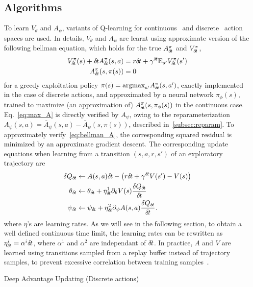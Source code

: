 \subsection{Algorithms}
\label{subsec:algorithm}
To learn $V_{\theta}$ and $A_{\psi}$, variants of Q-learning for continuous~\cite{ddpg} and
discrete~\cite{dqn} action spaces are used. In details, $V_{\theta}$ and $A_{\psi}$ are learnt
using approximate version of the following bellman equation, which holds for the true $A^\pi_{\delta\hspace{-.1em}t}$
and $V^\pi_{\delta\hspace{-.1em}t}$,
\begin{align}
	V^{\pi}_{\delta\hspace{-.1em}t}(s) + {\delta\hspace{-.1em}t} A^{\pi}_{\delta\hspace{-.1em}t}(s, a) &= r{\delta\hspace{-.1em}t} + \gamma^{{\delta\hspace{-.1em}t}}  \mathbb{E}_{s'} V^{\pi}_{\delta\hspace{-.1em}t}(s')\label{eq:bellman_A}\\
	A^{\pi}_{\delta\hspace{-.1em}t}(s, \pi(s)) &= 0\label{eq:max_A}
\end{align}
for a greedy exploitation policy $\pi(s) = \text{argmax}_{a'}A^\pi_{\delta\hspace{-.1em}t}(s,
a')$, exactly implemented in the case of discrete actions, and approximated by
a neural network $\pi_\phi(s)$, trained to maximize (an approximation of)
$A^\pi_{\delta\hspace{-.1em}t}(s, \pi_\phi(s))$ in the continuous case.  Eq.~\eqref{eq:max_A}
is directly verified by $A_{\psi}$, owing to the reparameterization
$A_\psi(s, a) = \bar{A}_\psi(s, a) - \bar{A}_\psi(s, \pi(s))$, described
in~\ref{subsec:reparam}.  To approximately verify~\eqref{eq:bellman_A}, the
corresponding squared residual is minimized by an approximate gradient descent.
The corresponding update equations when learning from a transition $(s, a, r, s')$ of
an exploratory trajectory are
\begin{align}
	\delta Q_{\delta\hspace{-.1em}t} &\leftarrow A(s, a) {\delta\hspace{-.1em}t} - \left(r {\delta\hspace{-.1em}t} + \gamma^{{\delta\hspace{-.1em}t}} V(s') - V(s)\right)\\
	\theta_{\delta\hspace{-.1em}t} &\leftarrow \theta_{\delta\hspace{-.1em}t} + \eta^1_{\delta\hspace{-.1em}t} \partial_{\theta} V(s) \frac{\delta Q_{\delta\hspace{-.1em}t}}{{\delta\hspace{-.1em}t}}\\
	\psi_{\delta\hspace{-.1em}t} &\leftarrow \psi_{\delta\hspace{-.1em}t} + \eta^2_{\delta\hspace{-.1em}t} \partial_{\psi} A(s, a) \frac{\delta Q_{\delta\hspace{-.1em}t}}{{\delta\hspace{-.1em}t}}.
	\label{eq:approx_bellman_A}
\end{align}
where $\eta$'s are learning rates. As we will see in the following section,
to obtain a well defined continuous time limit, the learning rates can be rewritten as
$\eta^i_{\delta\hspace{-.1em}t} = \alpha^i {\delta\hspace{-.1em}t}$, where $\alpha^1$ and $\alpha^2$ are independant
of ${\delta\hspace{-.1em}t}$. In practice, $A$ and $V$ are learned using
transitions sampled from a replay buffer instead of trajectory samples, to
prevent excessive correlation between training samples~\cite{dqn}.
\begin{algorithm}[ht]
	\caption{Deep Advantage Updating (Discrete actions)}
	
	\label{alg:dau}
\end{algorithm}

